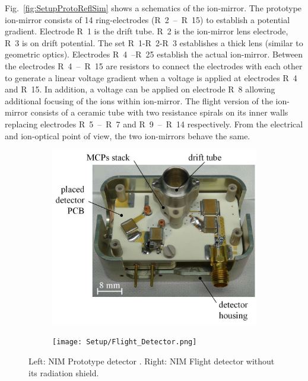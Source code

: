 	Fig.~\ref{fig:SetupProtoReflSim} shows a schematics of the ion-mirror. The prototype ion-mirror consists of 14 ring-electrodes (R~2~--~R~15) to establish a potential gradient. Electrode R~1 is the drift tube. R~2 is the ion-mirror lens electrode, R~3 is on drift potential. The set R~1-R~2-R~3 establishes a thick lens (similar to geometric optics). Electrodes R~4~--R~25 establish the actual ion-mirror. Between the electrodes R~4~--~R~15 are resistors to connect the electrodes with each other to generate a linear voltage gradient when a voltage is applied at electrodes R~4 and R~15. In addition, a voltage can be applied on electrode R~8 allowing additional focusing of the ions within ion-mirror. The flight version of the ion-mirror consists of a ceramic tube with two resistance spirals on its inner walls replacing electrodes R~5~--~R~7 and R~9~--~R~14 respectively. From the electrical and ion-optical point of view, the two ion-mirrors behave the same.\\
	\begin{figure}[h!] %
		\begin{subfigure}{0.5\textwidth}
			\centering
			\includegraphics[width=\textwidth]{Setup/Prototype_Detector.png}
		\end{subfigure}
		\begin{subfigure}{0.5\textwidth}
			\centering
			\texttt{[image: Setup/Flight\_Detector.png]}
		\end{subfigure}
		\caption{Left: NIM Prototype detector \cite{Diss_Meyer}. Right: NIM Flight detector without its radiation shield.}
		\label{fig:DetPhotos}
	\end{figure}
